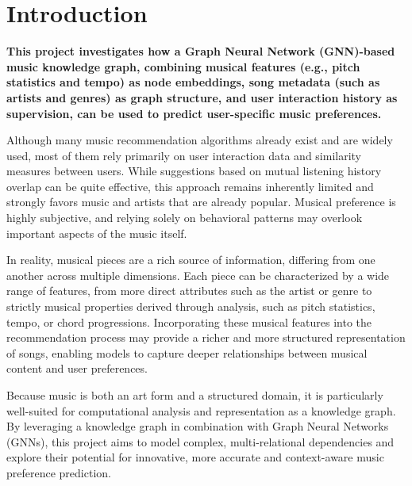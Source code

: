 \section{Introduction}
\label{sec:intro}
\textbf{This project investigates how a Graph Neural Network (GNN)-based music knowledge graph, combining musical features (e.g., pitch statistics and tempo) as node embeddings, song metadata (such as artists and genres) as graph structure, and user interaction history as supervision, can be used to predict user-specific music preferences.}

Although many music recommendation algorithms already exist and are widely used, most of them rely primarily on user interaction data and similarity measures between users. While suggestions based on mutual listening history overlap can be quite effective, this approach remains inherently limited and strongly favors music and artists that are already popular. Musical preference is highly subjective, and relying solely on behavioral patterns may overlook important aspects of the music itself.

In reality, musical pieces are a rich source of information, differing from one another across multiple dimensions. Each piece can be characterized by a wide range of features, from more direct attributes such as the artist or genre to strictly musical properties derived through analysis, such as pitch statistics, tempo, or chord progressions. Incorporating these musical features into the recommendation process may provide a richer and more structured representation of songs, enabling models to capture deeper relationships between musical content and user preferences.

Because music is both an art form and a structured domain, it is particularly well-suited for computational analysis and representation as a knowledge graph. By leveraging a knowledge graph in combination with Graph Neural Networks (GNNs), this project aims to model complex, multi-relational dependencies and explore their potential for innovative,  more accurate and context-aware music preference prediction.

